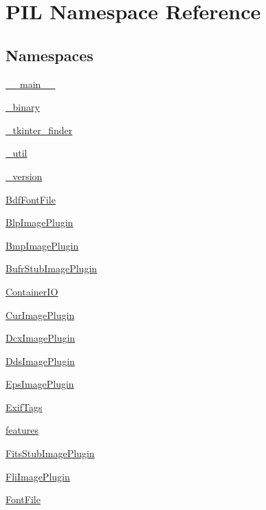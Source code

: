 \hypertarget{namespacePIL}{}\section{P\+IL Namespace Reference}
\label{namespacePIL}
\subsection*{Namespaces}
\begin{DoxyCompactItemize}
\item 
 \hyperlink{namespacePIL_1_1____main____}{\+\_\+\+\_\+main\+\_\+\+\_\+}
\item 
 \hyperlink{namespacePIL_1_1__binary}{\+\_\+binary}
\item 
 \hyperlink{namespacePIL_1_1__tkinter__finder}{\+\_\+tkinter\+\_\+finder}
\item 
 \hyperlink{namespacePIL_1_1__util}{\+\_\+util}
\item 
 \hyperlink{namespacePIL_1_1__version}{\+\_\+version}
\item 
 \hyperlink{namespacePIL_1_1BdfFontFile}{Bdf\+Font\+File}
\item 
 \hyperlink{namespacePIL_1_1BlpImagePlugin}{Blp\+Image\+Plugin}
\item 
 \hyperlink{namespacePIL_1_1BmpImagePlugin}{Bmp\+Image\+Plugin}
\item 
 \hyperlink{namespacePIL_1_1BufrStubImagePlugin}{Bufr\+Stub\+Image\+Plugin}
\item 
 \hyperlink{namespacePIL_1_1ContainerIO}{Container\+IO}
\item 
 \hyperlink{namespacePIL_1_1CurImagePlugin}{Cur\+Image\+Plugin}
\item 
 \hyperlink{namespacePIL_1_1DcxImagePlugin}{Dcx\+Image\+Plugin}
\item 
 \hyperlink{namespacePIL_1_1DdsImagePlugin}{Dds\+Image\+Plugin}
\item 
 \hyperlink{namespacePIL_1_1EpsImagePlugin}{Eps\+Image\+Plugin}
\item 
 \hyperlink{namespacePIL_1_1ExifTags}{Exif\+Tags}
\item 
 \hyperlink{namespacePIL_1_1features}{features}
\item 
 \hyperlink{namespacePIL_1_1FitsStubImagePlugin}{Fits\+Stub\+Image\+Plugin}
\item 
 \hyperlink{namespacePIL_1_1FliImagePlugin}{Fli\+Image\+Plugin}
\item 
 \hyperlink{namespacePIL_1_1FontFile}{Font\+File}
\item 

\end{DoxyCompactItemize}
